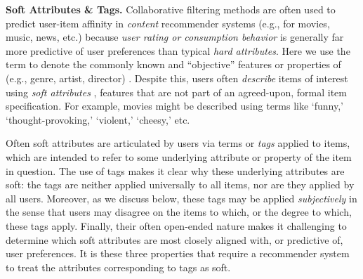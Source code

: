 \documentclass[manuscript,screen,nonacm]{acmart}
\newcommand{\1}{{\mathbf 1}}
\theoremstyle{TheoremNum}
\begin{document}
\vskip 2mm
\noindent
\textbf{Soft Attributes \& Tags.} \hspace*{2mm}
Collaborative filtering methods are often used to predict user-item affinity in \emph{content} recommender systems (e.g., for movies, music, news, etc.) because \emph{user rating or consumption behavior} is generally far more predictive of user preferences than typical \emph{hard attributes}. Here we use the term to denote the commonly known and ``objective'' features or properties of (e.g., genre, artist, director) \cite{grouplens:cacm97}. Despite this, users often \emph{describe} items of interest using \emph{soft attributes} \cite{radlinski:sdd2019,sigir21:filipandkristian}, features that are not part of an agreed-upon, formal item specification. For example, movies might be described using terms like `funny,' `thought-provoking,' `violent,' `cheesy,' etc.

Often soft attributes are articulated by users via terms or \emph{tags} applied to items, which are intended to refer to some underlying attribute or property of the item in question. The use of tags makes it clear why these underlying attributes are soft: the tags are neither applied universally to all items, nor are they applied by all users. Moreover, as we discuss below, these tags may be applied \emph{subjectively} in the sense that users may disagree on the items to which, or the degree to which, these tags apply. Finally, their often open-ended nature makes it challenging to determine which soft attributes are most closely aligned with, or predictive of, user preferences. It is these three properties that require a recommender system to treat the attributes corresponding to tags as soft. 
\end{document}

